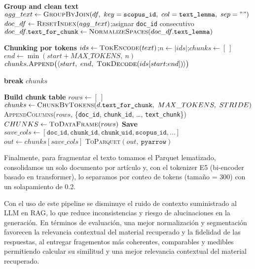\begin{enumerate}
\begin{algorithmEN}[H]
\begin{algorithmic}[1]
\Statex \textbf{Group and clean text}
\State $agg\_text \gets \textsc{GroupByJoin}(df,\ key=\texttt{scopus\_id},\ col=\texttt{text\_lemma},\ sep=" ")$
\State $doc\_df \gets \textsc{ResetIndex}(agg\_text)$;\quad asignar \texttt{doc\_id} consecutivo
\State $doc\_df.\texttt{text\_for\_chunk} \gets \textsc{NormalizeSpaces}(doc\_df.\texttt{text\_lemma})$

\Statex \textbf{Chunking por tokens}
  \State $ids \gets \textsc{TokEncode}(text)$;\quad $n \gets |ids|$;\quad $chunks \gets [\ ]$ 
    \State $end \gets \min(start{+}MAX\_TOKENS,\ n)$
\State $chunks.\textsc{Append}\big(\langle start,\ end,\ \textsc{TokDecode}(ids[start{:}end])\rangle\big)$ 

     \State \textbf{break} \EndIf
  \EndFor
  \State \Return $chunks$
\EndFunction

\Statex \textbf{Build chunk table}
\State $rows \gets [\ ]$
  \State $chunks \gets \textsc{ChunkByTokens}(d.\texttt{text\_for\_chunk},\ MAX\_TOKENS,\ STRIDE)$
    \State \textsc{AppendColumns}($rows$, \{\texttt{doc\_id}, \texttt{chunk\_id}, \ldots, \texttt{text\_chunk}\})
  \EndFor
\EndFor
\State $CHUNKS \gets \textsc{ToDataFrame}(rows)$
\Statex \textbf{Save}
\State $save\_cols \gets [\texttt{doc\_id},\texttt{chunk\_id},\texttt{chunk\_uid},\texttt{scopus\_id},...]$
\State $out \gets chunks[save\_cols]$
\State \textsc{ToParquet}$(out,\ \texttt{pyarrow})$ 
\end{algorithmic}
\end{algorithmEN}

Finalmente, para fragmentar el texto tomamos el Parquet lematizado, consolidamos un solo documento por artículo 
y, con el tokenizer E5 (bi-encoder basado en transformer), lo separamos por conteo de tokens (tamaño = 300) con un solapamiento de 0.2.
\end{enumerate}
Con el uso de este pipeline se disminuye el ruido de contexto suministrado al LLM en RAG, 
lo que reduce inconsistencias y riesgo de alucinaciones en la generación. En términos de evaluación, una mejor normalización y segmentación
 favorecen la relevancia contextual del material recuperado y la fidelidad de las respuestas, al entregar fragementos más coherentes, comparables y medibles permitiendo
 calcular su similitud y una mejor relevancia contextual del material recuperado.


